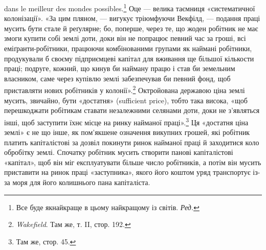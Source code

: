 dans le meilleur des mondes possibles.\footnote*{
Все буде якнайкраще в цьому найкращому із світів. \emph{Ред.}} Оце — велика таємниця «систематичної колонізації». «За цим
пляном, — вигукує тріюмфуючи Векфілд, —
подання праці мусить бути стале й реґулярне; бо, поперше, через те, що жоден робітник не має змоги
купити собі землі доти, доки він не попрацює певний час за гроші, всі еміґранти-робітники, працюючи
комбінованими групами як наймані робітники, продукували б своєму підприємцеві капітал для вживання
ще більшої кількости праці; подруге, кожний, що кинув би найману працю і став би земельним
власником, саме через купівлю землі забезпечував би певний фонд, щоб приставляти
нових робітників у колонії».\footnote{
\emph{Wakefield}. Там же, т. II, стор. 192.
} Октройована державою ціна землі мусить, звичайно, бути
«достатня» (sufficient price), тобто така висока, «щоб перешкоджати робітикам ставати незалежними
селянами доти, доки не з’являться інші, щоб заступити їхнє місце на ринку найманої праці».\footnote{
Там же, стор. 45.
} Ця
«достатня ціна землі» є не що інше, як пом’якшене означення викупних грошей, які робітник платить
капіталістові за дозвіл покинути ринок найманої праці й заходитися коло обробітку землі. Спочатку
робітник мусить створити панові капіталістові «капітал», щоб він міг експлуатувати більше число
робітників, а потім він мусить приставити на ринок праці «заступника», якого його коштом уряд
транспортує із-за моря для його колишнього пана капіталіста.

